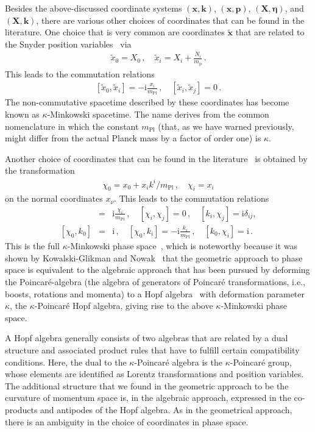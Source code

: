 \documentclass{article}
\def\beqn{\begin{eqnarray}}
\def\eeqn{\end{eqnarray}}
\begin{document}
Besides the above-discussed coordinate systems $(\mathbf{x},\mathbf{k})$, $(\mathbf{x}, \mathbf{p})$, $(\mathbf{X}, \boldsymbol{\eta})$, and $(\mathbf{X},\mathbf{k})$, there 
are various other choices of coordinates that can be found in the literature. 
One choice that is very common are coordinates $\tilde{\mathbf{x}}$ that are related to the Snyder
position variables~\cite{KowalskiGlikman:2003we} via
\beqn
\tilde x_0 = X_0  \,, \quad \tilde x_i = X_i + \frac{N_i}{m_{\mathrm{p}}} \,. \label{xX}
\eeqn
This leads to the commutation relations
\beqn
\left[ \tilde x_0, \tilde x_i \right] = - \mathrm{i} \frac{x_i}{m_{\mathrm{Pl}}} \,, \quad \left[ \tilde x_i, \tilde x_j \right] = 0 \,.
\eeqn
The non-commutative spacetime described by these coordinates has become known as $\kappa$-Minkowski spacetime.
The name derives from the common nomenclature in which the constant $m_{\mathrm{Pl}}$ (that, as we have warned previously, might differ from
the actual Planck mass by a factor of order one) is $\kappa$.  

Another choice of coordinates that can be found in the literature~\cite{Girelli:2005dc,Smolin:2010xa} is obtained by the transformation 
\beqn
{\chi}_0 = x_0 + x_i k^i/m_{\mathrm{Pl}} \,, \quad {\chi}_i = x_i  \label{chix}
\eeqn
on the normal coordinates $x_\nu$. This leads to the commutation relations
\beqn
[\chi_0, \chi_i] &=& \mathrm{i} \frac{\chi_i}{m_{\mathrm{Pl}}} \,,\quad [\chi_i, {\chi_j}]  = 0 \,, \quad [k_i, {\chi_j}]  = \mathrm{i} \delta_{ij}, \nonumber\\
\left[ \chi_0, k_0 \right] &=& \mathrm{i} \,,\quad  [\chi_0, k_i] =  - \mathrm{i} \frac{k_i}{m_{\mathrm{Pl}}} \,, \quad [k_0, \chi_i] = \mathrm{i} \,.
\eeqn
This is the full $\kappa$-Minkowski phase space~\cite{Lukierski:1992dt}, which is noteworthy because it was shown by Kowalski-Glikman and 
Nowak~\cite{KowalskiGlikman:2003we} that the geometric approach to phase space is equivalent
to the algebraic approach that has been pursued by deforming the Poincar\'e-algebra (the algebra of generators of Poincar\'e transformations, i.e., boosts, rotations and momenta) to a Hopf algebra~\cite{Majid:1994cy} with deformation parameter $\kappa$,
the $\kappa$-Poincar\'e Hopf algebra, giving rise to the above $\kappa$-Minkowski phase space.
 
A Hopf algebra generally consists of two algebras that are related by a dual structure and associated product rules that have to
fulfill certain compatibility conditions. Here, the dual
to the $\kappa$-Poincar\'e algebra is the $\kappa$-Poincar\'e group, whose elements are identified as Lorentz transformations
and position variables. The additional structure that we found in the geometric approach to be the curvature
of momentum space is, in the algebraic approach, expressed in the co-products
and antipodes of the Hopf algebra. As in the geometrical approach, there is an ambiguity in the choice of
coordinates in phase space.
\end{document}
